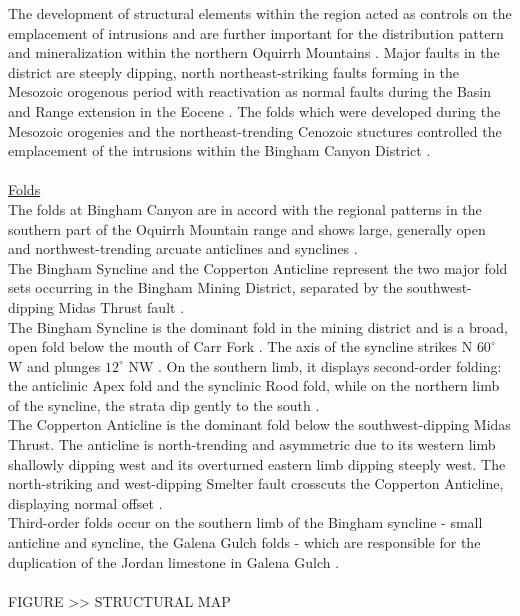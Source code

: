\documentclass[a4paper,11pt,titlepage]{article}
\begin{document}
The development of structural elements within the region acted as controls on the emplacement of intrusions and are further important for the distribution pattern and mineralization within the northern Oquirrh Mountains \citep{James1961}. Major faults in the district are steeply dipping, north northeast-striking faults forming in the Mesozoic orogenous period with reactivation as normal faults during the Basin and Range extension in the Eocene \citep{Farmin1933,Tooker1971,Atkinson1978a,Redmond2010a}. The folds which were developed during the Mesozoic orogenies and the northeast-trending Cenozoic stuctures controlled the emplacement of the intrusions within the Bingham Canyon District \citep{Presnell1997}.
\\
\\\underline{Folds}
\\ The folds at Bingham Canyon are in accord with the regional patterns in the southern part of the Oquirrh Mountain range and shows large, generally open and northwest-trending arcuate anticlines and synclines \citep{Boutwell1905,Gilluly1932}.
\\ The Bingham Syncline and the Copperton Anticline represent the two major fold sets occurring in the Bingham Mining District, separated by the southwest-dipping Midas Thrust fault \citep{Keith1905}.
\\ The Bingham Syncline is the dominant fold in the mining district and is a broad, open fold below the mouth of Carr Fork \citep{Keith1905}. The axis of the syncline strikes N $60^{\circ}$ W and plunges $12^{\circ}$ NW \citep{James1961}. On the southern limb, it displays second-order folding: the anticlinic Apex fold and the synclinic Rood fold, while on the northern limb of the syncline, the strata dip gently to the south \citep{Lanier1978}.
\\ The Copperton Anticline is the dominant fold below the southwest-dipping Midas Thrust. The anticline is north-trending and asymmetric due to its western limb shallowly dipping west and its overturned eastern limb dipping steeply west. The north-striking and west-dipping Smelter fault crosscuts the Copperton Anticline, displaying normal offset \citep{Babcock1995}.
\\ Third-order folds occur on the southern limb of the Bingham syncline - small anticline and syncline, the Galena Gulch folds - which are responsible for the duplication of the Jordan limestone in Galena Gulch \citep{Lanier1978}.
\\
\\ FIGURE >> STRUCTURAL MAP
\end{document}
